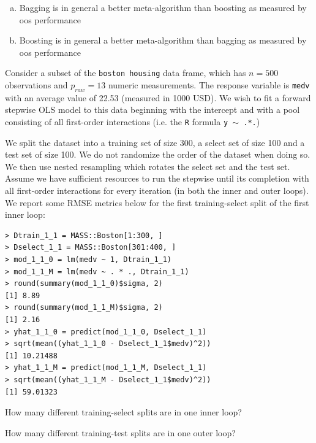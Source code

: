 \documentclass[12pt]{article}
\begin{document}
\begin{enumerate}[(a)]
\item[] Bagging is in general a better meta-algorithm than boosting as measured by oos performance
\item[] Boosting is in general a better meta-algorithm than bagging as measured by oos performance
\end{enumerate}
\pagebreak

\eenum

\problem Consider a subset of the \texttt{boston housing} data frame, which has $n = 500$ observations and $p_{raw} = 13$ numeric measurements. The response variable is \texttt{medv} with an average value of 22.53 (measured in 1000 USD). We wish to fit a forward stepwise OLS model to this data beginning with the intercept and with a pool consisting of all first-order interactions (i.e. the \texttt{R} formula \texttt{y $\sim$ .*.}) 

We split the dataset into a training set of size 300, a select set of size 100 and a test set of size 100. We do not randomize the order of the dataset when doing so. We then use nested resampling which rotates the select set and the test set. Assume we have sufficient resources to run the stepwise until its completion with all first-order interactions for every iteration (in both the inner and outer loops). We report some RMSE metrics below for the first training-select split of the first inner loop:

\begin{Verbatim}[frame=single]
> Dtrain_1_1 = MASS::Boston[1:300, ]
> Dselect_1_1 = MASS::Boston[301:400, ]
> mod_1_1_0 = lm(medv ~ 1, Dtrain_1_1)
> mod_1_1_M = lm(medv ~ . * ., Dtrain_1_1)
> round(summary(mod_1_1_0)$sigma, 2)
[1] 8.89
> round(summary(mod_1_1_M)$sigma, 2)
[1] 2.16
> yhat_1_1_0 = predict(mod_1_1_0, Dselect_1_1)
> sqrt(mean((yhat_1_1_0 - Dselect_1_1$medv)^2))
[1] 10.21488
> yhat_1_1_M = predict(mod_1_1_M, Dselect_1_1)
> sqrt(mean((yhat_1_1_M - Dselect_1_1$medv)^2))
[1] 59.01323
\end{Verbatim}

\benum

 How many different training-select splits are in one inner loop?\\

 How many different training-test splits are in one outer loop?\\
\end{document}
